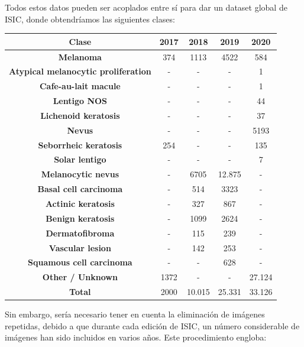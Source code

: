 Todos estos datos pueden ser acoplados entre sí para dar un dataset global de ISIC\cite{CASSIDY2022102305}, donde obtendríamos las siguientes clases: 


\begin{table}[H]
	\centering
	\begin{tabular}{|c|c|c|c|c|}
		\hline
		\textbf{Clase} & \textbf{2017} & \textbf{2018} & \textbf{2019} & \textbf{2020} \\ \hline
		\textbf{Melanoma} & 374 & 1113 & 4522 & 584 \\ \hline
		\textbf{Atypical melanocytic proliferation} & - & - & - & 1 \\ \hline
		\textbf{Cafe-au-lait macule} & - & - & - & 1 \\ \hline
		\textbf{Lentigo NOS} & - & - & - & 44 \\ \hline
		\textbf{Lichenoid keratosis} & - & - & - & 37 \\ \hline
		\textbf{Nevus} & - & - & - & 5193 \\ \hline
		\textbf{Seborrheic keratosis} & 254 & - & - & 135 \\ \hline
		\textbf{Solar lentigo} & - & - & - & 7 \\ \hline
		\textbf{Melanocytic nevus} & - & 6705 & 12.875 & - \\ \hline
		\textbf{Basal cell carcinoma} & - & 514 & 3323 & - \\ \hline
		\textbf{Actinic keratosis} & - & 327 & 867 & - \\ \hline
		\textbf{Benign keratosis} & - & 1099 & 2624 & - \\ \hline
		\textbf{Dermatofibroma} & - & 115 & 239 & - \\ \hline
		\textbf{Vascular lesion} & - & 142 & 253 & - \\ \hline
		\textbf{Squamous cell carcinoma} & - & - & 628 & - \\ \hline
		\textbf{Other / Unknown} & 1372 & - & - & 27.124 \\ \hline
		\textbf{Total} & 2000 & 10.015 & 25.331 & 33.126 \\ \hline
	\end{tabular}
\end{table}

Sin embargo, sería necesario tener en cuenta la eliminación de imágenes repetidas, debido a que durante cada edición de ISIC, un número considerable de imágenes han sido incluidos en varios años. Este procedimiento engloba:

